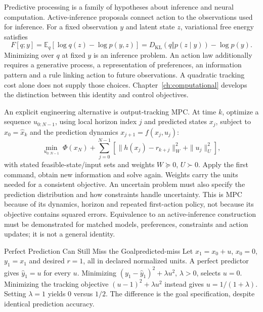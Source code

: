Predictive processing is a family of hypotheses about inference and neural
computation. Active-inference proposals connect action to the observations
used for inference\cite{FristonAction2010Review}. For a fixed
observation $y$ and latent state $z$, variational free energy satisfies
\begin{equation}
 F[q;y]=\mathbb E_q[\log q(z)-\log p(y,z)]
       =D_{\mathrm{KL}}(q\Vert p(z\mid y))-\log p(y).
\end{equation}
Minimizing over $q$ at fixed $y$ is an inference problem. An action law additionally
requires a generative process, a representation of preferences, an information
pattern and a rule linking action to future observations. A quadratic tracking
cost alone does not supply those choices. Chapter~\ref{ch:computational}
develops the distinction between this identity and control objectives.

An explicit engineering alternative is output-tracking MPC. At time $k$, optimize
a sequence $u_{0:N-1}$, using local horizon index $j$ and predicted states $x_j$,
subject to $x_0=\hat x_k$ and the prediction dynamics
$x_{j+1}=f(x_j,u_j)$:
\begin{equation}
 \min_{u_{0:N-1}}\ \Phi(x_N)+\sum_{j=0}^{N-1}
 \left[\|h(x_j)-r_{k+j}\|_W^2+\|u_j\|_U^2\right],
 \label{eq:ch5:tracking-mpc}
\end{equation}
with stated feasible-state/input sets and weights $W\succeq0$, $U\succ0$.
Apply the first command, obtain new information and solve again. Weights carry
the units needed for a consistent objective. An uncertain problem must also
specify the prediction distribution and how constraints handle uncertainty.
This is MPC because of its dynamics, horizon and repeated first-action policy,
not because its objective contains squared errors. Equivalence to an
active-inference construction must be demonstrated for matched models,
preferences, constraints and action updates; it is not a general identity.

\begin{example}{Perfect Prediction Can Still Miss the Goal}{predicted-miss}
 Let $x_1=x_0+u$, $x_0=0$, $y_1=x_1$ and desired $r=1$, all in declared
 normalized units. A perfect predictor gives $\hat y_1=u$ for every $u$.
 Minimizing $(y_1-\hat y_1)^2+\lambda u^2$, $\lambda>0$, selects $u=0$.
 Minimizing the tracking objective $(u-1)^2+\lambda u^2$ instead gives
 $u=1/(1+\lambda)$. Setting $\lambda=1$ yields $0$ versus $1/2$.
 The difference is the goal specification, despite identical prediction accuracy.
\end{example}

